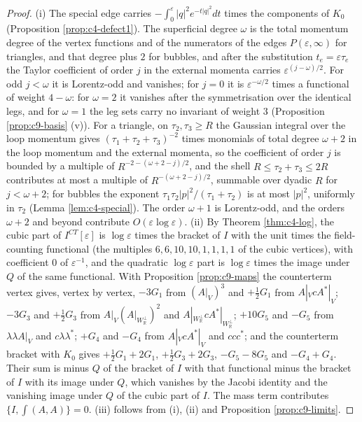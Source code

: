 \begin{proof}
(i) The special edge carries $-\int_0^\varepsilon|q|^2e^{-t|q|^2}dt$ times the components of $K_0$ (Proposition \ref{prop:c4-defect1}). The superficial degree $\omega$ is the total momentum degree of the vertex functions and of the numerators of the edges $P(\varepsilon,\infty)$ for triangles, and that degree plus $2$ for bubbles, and after the substitution $t_e=\varepsilon\tau_e$ the Taylor coefficient of order $j$ in the external momenta carries $\varepsilon^{(j-\omega)/2}$. For odd $j<\omega$ it is Lorentz-odd and vanishes; for $j=0$ it is $\varepsilon^{-\omega/2}$ times a functional of weight $4-\omega$: for $\omega=2$ it vanishes after the symmetrisation over the identical legs, and for $\omega=1$ the leg sets carry no invariant of weight $3$ (Proposition \ref{prop:c9-basis} (v)). For a triangle, on $\tau_2,\tau_3\ge R$ the Gaussian integral over the loop momentum gives $(\tau_1+\tau_2+\tau_3)^{-2}$ times monomials of total degree $\omega+2$ in the loop momentum and the external momenta, so the coefficient of order $j$ is bounded by a multiple of $R^{-2-(\omega+2-j)/2}$, and the shell $R\le\tau_2+\tau_3\le2R$ contributes at most a multiple of $R^{-(\omega+2-j)/2}$, summable over dyadic $R$ for $j<\omega+2$; for bubbles the exponent $\tau_1\tau_2|p|^2/(\tau_1+\tau_2)$ is at most $|p|^2$, uniformly in $\tau_2$ (Lemma \ref{lem:c4-special}). The order $\omega+1$ is Lorentz-odd, and the orders $\omega+2$ and beyond contribute $O(\varepsilon\log\varepsilon)$.
(ii) By Theorem \ref{thm:c4-log}, the cubic part of $I^{CT}[\varepsilon]$ is $\log\varepsilon$ times the bracket of $I$ with the unit times the field-counting functional (the multiples $6,6,10,10,1,1,1,1$ of the cubic vertices), with coefficient $0$ of $\varepsilon^{-1}$, and the quadratic $\log\varepsilon$ part is $\log\varepsilon$ times the image under $Q$ of the same functional. With Proposition \ref{prop:c9-maps} the counterterm vertex gives, vertex by vertex, $-3G_1$ from $(A|_V)^3$ and $+\tfrac12G_1$ from $A|_VcA^*|_V$; $-3G_3$ and $+\tfrac12G_3$ from $A|_V(A|_{W_{\mathbb R}^\perp})^2$ and $A|_{W_{\mathbb R}^\perp}cA^*|_{W_{\mathbb R}^\perp}$; $+10G_5$ and $-G_5$ from $\lambda\lambda A|_V$ and $c\lambda\lambda^*$; $+G_4$ and $-G_4$ from $A|_VcA^*|_V$ and $ccc^*$; and the counterterm bracket with $K_0$ gives $+\tfrac12G_1+2G_1$, $+\tfrac12G_3+2G_3$, $-G_5-8G_5$ and $-G_4+G_4$. Their sum is minus $Q$ of the bracket of $I$ with that functional minus the bracket of $I$ with its image under $Q$, which vanishes by the Jacobi identity and the vanishing image under $Q$ of the cubic part of $I$. The mass term contributes $\{I,\int(A,A)\}=0$. (iii) follows from (i), (ii) and Proposition \ref{prop:c9-limits}.
\end{proof}

